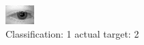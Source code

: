 \begin{figure}[h!]
\begin{center}
\includegraphics[width=0.60\columnwidth]{figures/ID414_class_1_target_2.png}
\end{center}
\caption{ Classification: 1 actual target: 2}
\label{fig:ID414_class_1_target_2}
\end{figure}
